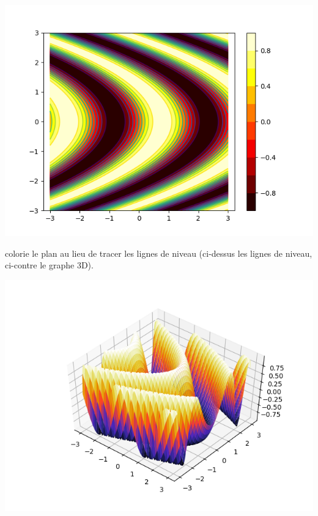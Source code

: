 \documentclass[11pt,class=report,crop=false]{standalone}
\begin{document}
\begin{center}
\includegraphics[scale=\myscale,scale=0.8]{figures/pythonxy-niveau-2d-3}
\end{center}

\begin{minipage}{0.45\textwidth}
 colorie le plan au lieu de tracer les lignes de niveau (ci-dessus les lignes de niveau, ci-contre le graphe 3D).
\end{minipage}
\begin{minipage}{0.45\textwidth}
\begin{center}
\includegraphics[scale=\myscale,scale=0.5]{figures/pythonxy-niveau-3d-3}
\end{center}
\end{minipage}
\end{document}
